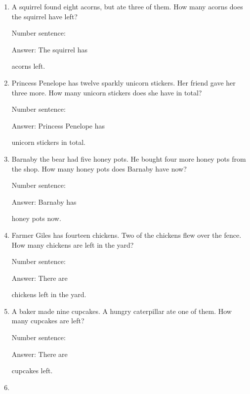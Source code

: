 \documentclass{tufte-book}
\begin{document}
\begin{enumerate}

\item
  A squirrel found eight acorns, but ate three of them. How many acorns
  does the squirrel have left?\medskip\par
  Number sentence:
  \dotfill\medskip\par
  Answer: The squirrel has
  \dotfill\medskip\par\mbox{}\dotfill\medskip\par\mbox{}\dotfill\bigskip
  acorns left.
\item
  Princess Penelope has twelve sparkly unicorn stickers. Her friend gave
  her three more. How many unicorn stickers does she have in total?\medskip\par
  Number sentence:
  \dotfill\medskip\par
  Answer: Princess Penelope has
  \dotfill\medskip\par\mbox{}\dotfill\medskip\par\mbox{}\dotfill\bigskip
  unicorn stickers in total.
\item
  Barnaby the bear had five honey pots. He bought four more honey pots
  from the shop. How many honey pots does Barnaby have now?\medskip\par
  Number sentence:
  \dotfill\medskip\par
  Answer: Barnaby has
  \dotfill\medskip\par\mbox{}\dotfill\medskip\par\mbox{}\dotfill\bigskip
  honey pots now.
\item
  Farmer Giles has fourteen chickens. Two of the chickens flew over the
  fence. How many chickens are left in the yard?\medskip\par
  Number sentence:
  \dotfill\medskip\par
  Answer: There are
  \dotfill\medskip\par\mbox{}\dotfill\medskip\par\mbox{}\dotfill\bigskip
  chickens left in the yard.
\item
  A baker made nine cupcakes. A hungry caterpillar ate one of them. How
  many cupcakes are left?\medskip\par
  Number sentence:
  \dotfill\medskip\par
  Answer: There are
  \dotfill\medskip\par\mbox{}\dotfill\medskip\par\mbox{}\dotfill\bigskip
  cupcakes left.
\item

\end{enumerate}
\end{document}
